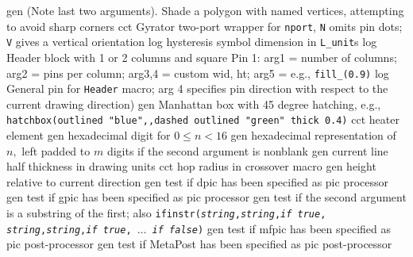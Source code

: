   {gen}
  {(Note last two arguments).  Shade a polygon with named
    vertices, attempting to avoid sharp corners}
  {cct}
  {Gyrator two-port wrapper for {\tt nport}, {\tt N} omits pin dots; {\tt V}
   gives a vertical orientation
   }
%
  {log}
  {hysteresis symbol dimension in {\tt L\_unit}s}
  {log}
  {Header block with 1 or 2 columns and square Pin 1:
   arg1 = number of columns;
   arg2 = pins per column;
   arg3,4 = custom wid, ht;
   arg5 = e.g., {\tt fill\_(0.9)}
    }
  {log}
  {General pin for {\tt Header} macro; arg 4 specifies pin direction
   with respect to the current drawing direction)}
  {gen}
  {Manhattan box with 45 degree hatching, e.g.,
   {\tt hatchbox(outlined "blue",,dashed outlined "green" thick 0.4)}}
  {cct}
  {heater element}
  {gen}
  {hexadecimal digit for $0 \leq n < 16$}
  {gen}
  {hexadecimal representation of $n,$ left padded to $m$ digits if the second
   argument is nonblank}
  {gen}
  {current line half thickness in drawing units}
  {cct}
  {hop radius in crossover macro}
  {gen}
  {height relative to current direction}
%
  {gen}
  {test if dpic has been specified as pic processor}
  {gen}
  {test if gpic has been specified as pic processor}
  {gen}
  {test if the second argument is a substring of the first; also
  {\tt ifinstr({\sl string},{\sl string},{\sl if true},{\sl
  string},{\sl string},{\sl if true}, $\ldots$ {\sl if false})}
    }
  {gen}
  {test if mfpic has been specified as pic post-processor}
  {gen}
  {test if MetaPost has been specified as pic post-processor}

